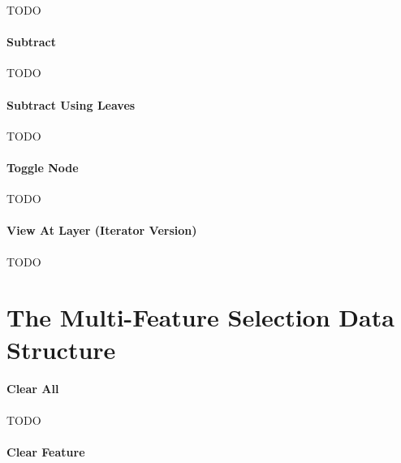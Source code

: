 TODO

\paragraph{Subtract}

TODO

\paragraph{Subtract Using Leaves}

TODO

\paragraph{Toggle Node}

TODO

\paragraph{View At Layer (Iterator Version)}

TODO

\section{The Multi-Feature Selection Data Structure}

\paragraph{Clear All}

TODO

\paragraph{Clear Feature}

